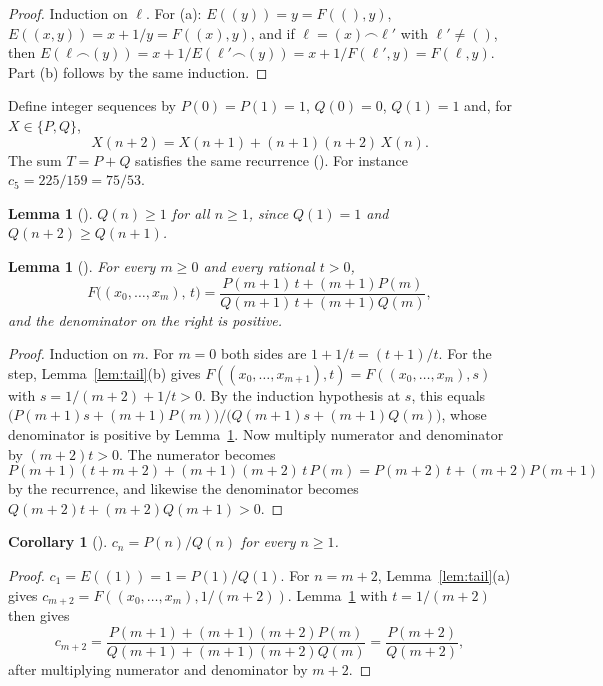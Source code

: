 \documentclass[11pt]{amsart}
\theoremstyle{plain}
\newtheorem{lemma}[theorem]{Lemma}
\newtheorem{corollary}[theorem]{Corollary}
\theoremstyle{definition}
\begin{document}
\begin{proof}
Induction on $\ell$. For (a): $E((y))=y=F((),y)$, $E((x,y))=x+1/y=F((x),y)$, and if $\ell=(x)\frown\ell'$ with $\ell'\ne()$, then $E(\ell\frown(y))=x+1/E(\ell'\frown(y))=x+1/F(\ell',y)=F(\ell,y)$. Part (b) follows by the same induction.
\end{proof}

Define integer sequences by $P(0)=P(1)=1$, $Q(0)=0$, $Q(1)=1$ and, for $X\in\{P,Q\}$,
\[
  X(n+2)=X(n+1)+(n+1)(n+2)\,X(n).
\]
The sum $T=P+Q$ satisfies the same recurrence (). For instance $c_5=225/159=75/53$.

\begin{lemma}[]\label{lem:qpos}
$Q(n)\ge1$ for all $n\ge1$, since $Q(1)=1$ and $Q(n+2)\ge Q(n+1)$.
\end{lemma}

\begin{lemma}[]\label{lem:moebius}
For every $m\ge0$ and every rational $t>0$,
\[
  F\bigl((x_0,\dots,x_m),\,t\bigr)=\frac{P(m+1)\,t+(m+1)P(m)}{Q(m+1)\,t+(m+1)Q(m)},
\]
and the denominator on the right is positive.
\end{lemma}

\begin{proof}
Induction on $m$. For $m=0$ both sides are $1+1/t=(t+1)/t$. For the step, Lemma~\ref{lem:tail}(b) gives $F((x_0,\dots,x_{m+1}),t)=F((x_0,\dots,x_m),s)$ with $s=1/(m+2)+1/t>0$. By the induction hypothesis at $s$, this equals $\bigl(P(m+1)s+(m+1)P(m)\bigr)/\bigl(Q(m+1)s+(m+1)Q(m)\bigr)$, whose denominator is positive by Lemma~\ref{lem:qpos}. Now multiply numerator and denominator by $(m+2)t>0$. The numerator becomes
\[
  P(m+1)(t+m+2)+(m+1)(m+2)\,t\,P(m)=P(m+2)\,t+(m+2)P(m+1)
\]
by the recurrence, and likewise the denominator becomes $Q(m+2)t+(m+2)Q(m+1)>0$.
\end{proof}

\begin{corollary}[]\label{cor:conv}
$c_n=P(n)/Q(n)$ for every $n\ge1$.
\end{corollary}

\begin{proof}
$c_1=E((1))=1=P(1)/Q(1)$. For $n=m+2$, Lemma~\ref{lem:tail}(a) gives $c_{m+2}=F((x_0,\dots,x_m),1/(m+2))$. Lemma~\ref{lem:moebius} with $t=1/(m+2)$ then gives
\[
  c_{m+2}=\frac{P(m+1)+(m+1)(m+2)P(m)}{Q(m+1)+(m+1)(m+2)Q(m)}=\frac{P(m+2)}{Q(m+2)},
\]
after multiplying numerator and denominator by $m+2$.
\end{proof}
\end{document}
